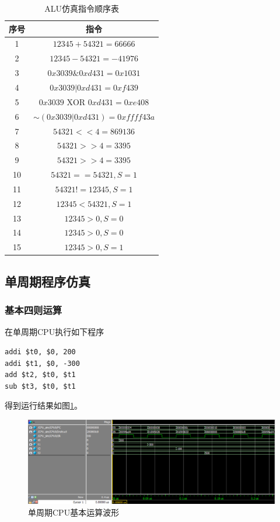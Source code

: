 \documentclass{ctexart}
\begin{document}
	\begin{table}[ht]
		\centering
		\begin{tabular}{c|c}
			\hline
				序号 & 指令 \\
			\hline
				1 & $12345 + 54321 = 66666$ \\
				2 & $12345 - 54321 = -41976$ \\
				3 & $0x3039 \& 0xd431 = 0x1031$ \\
				4 & $0x3039 | 0xd431 = 0xf439$ \\
				5 & $0x3039  \text{ XOR }  0xd431 = 0xe408$ \\
				6 & $\sim(0x3039 | 0xd431) = 0xffff43a$  \\
				7 & $54321 << 4 = 869136$\\
				8 & $54321 >> 4 = 3395$\\
				9 & $54321 >> 4 = 3395$\\
				10 & $54321 == 54321, S = 1$\\
				11 & $54321 != 12345, S = 1$\\
				12 & $12345 < 54321, S = 1$\\
				13 & $12345 > 0, S = 0$ \\
				14 & $12345 > 0, S = 0$ \\
				15 & $12345 > 0, S = 1$ \\
			\hline
		\end{tabular}
		\caption{ALU仿真指令顺序表}
		\label{simtable1}
	\end{table}

	\clearpage

	\subsection{单周期程序仿真}
	\subsubsection{基本四则运算}
	在单周期CPU执行如下程序
	\begin{lstlisting}
addi $t0, $0, 200
addi $t1, $0, -300
add $t2, $t0, $t1
sub $t3, $t0, $t1
	\end{lstlisting}

	得到运行结果如图\ref{simpicture2}。

	\begin{figure}[ht]
		\centering
		\includegraphics[width = \textwidth]{OneCycleTestWave1.eps}
		\caption{单周期CPU基本运算波形}
		\label{simpicture2}
	\end{figure}
\end{document}
